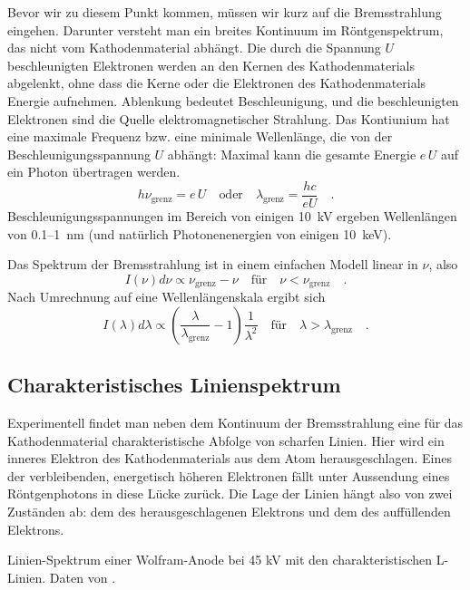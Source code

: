Bevor wir zu diesem Punkt kommen, müssen wir kurz auf die Bremsstrahlung eingehen. Darunter versteht man ein breites Kontinuum im Röntgenspektrum,  das nicht vom Kathodenmaterial abhängt. Die durch die Spannung $U$ beschleunigten Elektronen werden an den Kernen des Kathodenmaterials abgelenkt, ohne dass die Kerne oder die Elektronen des Kathodenmaterials Energie aufnehmen. Ablenkung bedeutet Beschleunigung, und die beschleunigten Elektronen sind die Quelle  elektromagnetischer Strahlung.  Das Kontiunium hat eine maximale Frequenz bzw. eine minimale Wellenlänge, die von der Beschleunigungsspannung $U$ abhängt: Maximal kann die gesamte Energie $e \, U$ auf ein Photon übertragen werden.
\begin{equation}
    h \nu_\text{grenz} = e \, U \quad \text{oder} \quad
    \lambda_\text{grenz} = \frac{h c}{e U} \quad .
\end{equation}
Beschleunigungsspannungen im Bereich von einigen 10~kV ergeben Wellenlängen von 0.1--1~nm (und natürlich Photonenenergien von einigen 10~keV).

Das Spektrum der Bremsstrahlung ist in einem einfachen Modell linear in $\nu$, also 
\begin{equation}
    I(\nu) d\nu \propto \nu_\text{grenz} - \nu \quad \text{für} \quad  \nu < \nu_\text{grenz} \quad .
\end{equation}
Nach Umrechnung auf eine Wellenlängenskala ergibt sich
\begin{equation}
    I(\lambda) d\lambda \propto \left( \frac{\lambda}{\lambda_\text{grenz}} - 1 \right) \frac{1}{\lambda^2} 
    \quad \text{für} \quad  \lambda > \lambda_\text{grenz} \quad .
\end{equation}




\subsection{Charakteristisches Linienspektrum}

Experimentell findet man neben dem Kontinuum der Bremsstrahlung eine für das Kathodenmaterial charakteristische Abfolge von scharfen Linien. Hier wird ein inneres Elektron des Kathodenmaterials aus dem Atom herausgeschlagen. Eines der verbleibenden, energetisch höheren Elektronen fällt unter Aussendung eines Röntgenphotons in diese Lücke zurück. Die Lage der Linien hängt also von zwei Zuständen ab: dem des herausgeschlagenen Elektrons und dem des auffüllenden Elektrons.

\begin{marginfigure}
    \caption{Linien-Spektrum einer Wolfram-Anode bei 45 kV mit den charakteristischen L-Linien. Daten von \cite{Gilfrich68}.}
    \label{fig:7_linienspektrum}
\end{marginfigure}


